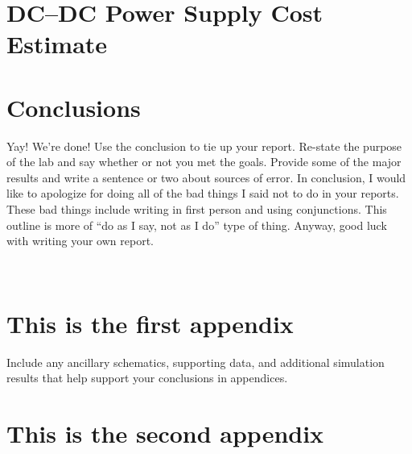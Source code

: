 \documentclass[11pt]{article}
\begin{document}
\section{DC--DC Power Supply Cost Estimate}
\label{cost_section}

\section{Conclusions}
\label{con_section}

Yay! We’re done! Use the conclusion to tie up your report. Re-state the purpose of the lab and say whether or not you met the goals. Provide some of the major results and write a sentence or two about sources of error. In conclusion, I would like to apologize for doing all of the bad things I said not to do in your reports. These bad things include writing in first person and using conjunctions. This outline is more of “do as I say, not as I do” type of thing. Anyway, good luck with writing your own report.

 
\newpage
\begin{appendices}
\section{This is the first appendix}

Include any ancillary schematics, supporting data, and additional simulation results that help support your conclusions in appendices.

\section{This is the second appendix}
\end{appendices}

\newpage
\end{document}
